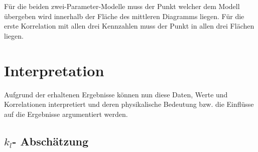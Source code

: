 \documentclass[12pt,liststotoc]{report}
\begin{document}
Für die beiden zwei-Parameter-Modelle muss der Punkt welcher dem Modell übergeben wird innerhalb der Fläche des mittleren Diagramms liegen. Für die erste Korrelation mit allen drei Kennzahlen muss der Punkt in allen drei Flächen liegen.



\chapter{Interpretation}

Aufgrund der erhaltenen Ergebnisse können nun diese Daten, Werte und Korrelationen interpretiert und deren physikalische Bedeutung bzw. die Einflüsse auf die Ergebnisse argumentiert werden.

\section{$k_l$- Abschätzung}
\end{document}
